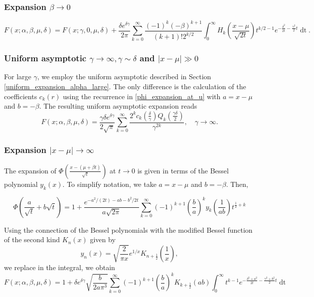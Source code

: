 \documentclass[10pt,a4paper,oneside]{article}
\numberwithin{equation}{section}
\begin{document}
\subsubsection{Expansion $\beta \to 0$}

\begin{equation}
F(x; \alpha, \beta, \mu, \delta) = F(x; \gamma, 0, \mu, \delta) + \frac{\delta e^{\delta \gamma}}{2\pi} \sum_{k=0}^{\infty} \frac{(-1)^k (-\beta)^{k+1}}{(k+1)! 2^{k/2}} \int_0^{\infty} H_k\left(\frac{x-\mu}{\sqrt{2t}}\right) t^{k/2 - 1} e^{-\frac{\delta^2}{2t} - \frac{\gamma^2}{2}t} \mathop{dt}.
\end{equation}

\subsubsection{Uniform asymptotic $\gamma \to \infty, \gamma \sim \delta$ and $|x-\mu| \gg 0$}
For large $\gamma$, we employ the uniform asymptotic described in Section \ref{uniform_expansion_alpha_large}. The only difference is the calculation of the coefficients $c_k(r)$ using the recurrence in \eqref{phi_expansion_at_u} with $a = x-\mu$ and $b = -\beta$. The resulting uniform asymptotic expansion reads
\begin{equation}
F(x; \alpha, \beta, \mu, \delta) = \frac{\gamma \delta e^{\delta \gamma}}{2\sqrt{\pi}} \sum_{k=0}^{\infty} \frac{2^k c_k\left(\frac{\delta}{\gamma}\right) Q_k\left(\frac{\gamma\delta}{2}\right)}{\gamma^{2k}}, \quad \gamma \to \infty.
\end{equation}


\subsubsection{Expansion $|x-\mu| \to \infty$}

The expansion of $\Phi\left(\frac{x-(\mu + \beta t)}{\sqrt{t}}\right)$ at $t\to 0$ is given in terms of the Bessel polynomial $y_k(x)$. To simplify notation, we take $a = x-\mu$ and $b=-\beta$. Then,

\begin{equation}
\Phi\left(\frac{a}{\sqrt{t}} + b\sqrt{t}\right) = 1 + \frac{e^{-a^2/(2t) -ab - b^2/2 t}}{a\sqrt{2\pi}}\sum_{k=0}^{\infty} (-1)^{k+1} \left(\frac{b}{a}\right)^k y_k\left(\frac{1}{ab}\right) t^{\frac{1}{2} + k}
\end{equation}

Using the connection of the Bessel polynomials with the modified Bessel function of the second kind $K_n(x)$ given by
\begin{equation}
y_n(x) = \sqrt{\frac{2}{\pi x}}e^{1/x} K_{n + \frac{1}{2}}\left(\frac{1}{x}\right),
\end{equation}
we replace in the integral, we obtain
\begin{equation}
F(x; \alpha, \beta, \mu, \delta) = 1 + \delta e^{\delta \gamma} \sqrt{\frac{b}{2a\pi^3}}\sum_{k=0}^{\infty} (-1)^{k+1} \left(\frac{b}{a}\right)^k K_{k + \frac{1}{2}}(ab)\int_0^{\infty}t^{k-1} e^{-\frac{\delta^2 + a^2}{2t} -\frac{\gamma^2 + b^2}{2}t} \mathop{dt}
\end{equation}
\end{document}
